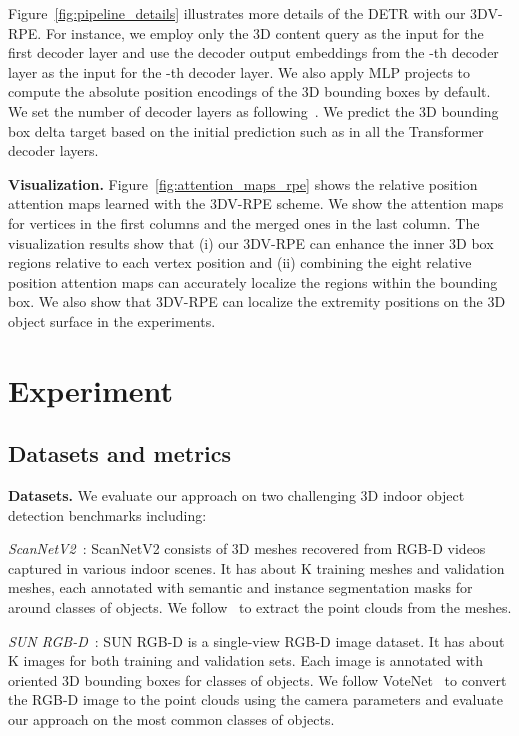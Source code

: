 \documentclass[10pt,twocolumn,letterpaper]{article}
\begin{document}
Figure~\ref{fig:pipeline_details} illustrates more details of the DETR with our 3DV-RPE. For instance, we employ only the 3D content query  as the input for the first decoder layer and use the decoder output embeddings  from the -th decoder layer as the input for the -th decoder layer. We also apply MLP projects to compute the absolute position encodings of the 3D bounding boxes by default. We set the number of decoder layers as  following~\cite{misra2021-3detr}.
We predict the 3D bounding box delta target based on the initial prediction such as  in all the Transformer decoder layers.



\vspace{1mm}
\noindent\textbf{Visualization.}
Figure~\ref{fig:attention_maps_rpe} shows the relative position attention maps learned with the 3DV-RPE scheme. We show the attention maps for  vertices in the first  columns and the merged ones in the last column. The visualization results show that (i) our 3DV-RPE can enhance the inner 3D box regions relative to each vertex position and (ii) combining the eight relative position attention maps can accurately localize the regions within the bounding box. We also show that 3DV-RPE can localize the extremity positions on the 3D object surface in the experiments.


\section{Experiment}
\subsection{Datasets and metrics}
\noindent \textbf{Datasets.} We evaluate our approach on two challenging 3D indoor object detection benchmarks including:

\noindent \emph{ScanNetV2}~\cite{dai2017scannet}: ScanNetV2 consists of 3D meshes recovered from RGB-D videos captured in various indoor scenes. It has about K training meshes and  validation meshes, each annotated with semantic and instance segmentation masks for around  classes of objects. We follow~\cite{qi2019deep} to extract the point clouds from the meshes.

\noindent \emph{SUN RGB-D}~\cite{song2015sun}: SUN RGB-D is a single-view RGB-D image dataset. It has about K images for both training and validation sets. Each image is annotated with oriented 3D bounding boxes for  classes of objects. We follow VoteNet~\cite{qi2019deep} to convert the RGB-D image to the point clouds using the camera parameters and evaluate our approach on the  most common classes of objects.
\end{document}
